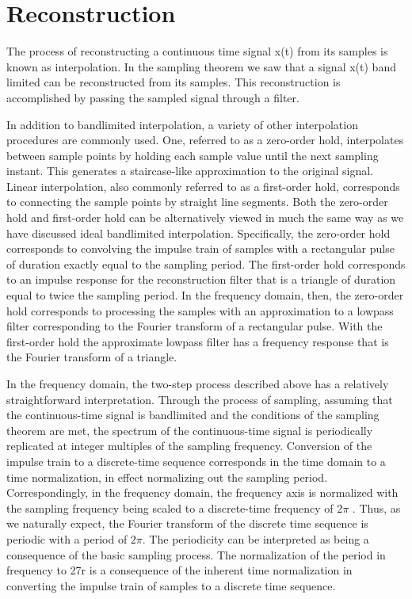 \documentclass{article}
\begin{document}
\section{Reconstruction}

The process of reconstructing a continuous time signal x(t) from its samples is known as interpolation. In the sampling theorem we saw that a signal x(t) band limited can be reconstructed from its samples. This reconstruction is accomplished by passing the sampled signal through a filter.  

In addition to bandlimited interpolation, a variety of other interpolation procedures are commonly used. One, referred to as a zero-order hold, interpolates between sample points by holding each sample value until the next sampling instant. This generates a staircase-like approximation to the original signal. Linear interpolation, also commonly referred to as a first-order hold, corresponds to connecting the sample points by straight line segments. Both the zero-order hold and first-order hold can be alternatively viewed in much the same way as we have discussed ideal bandlimited interpolation. Specifically, the zero-order hold corresponds to convolving the impulse train of samples with a rectangular pulse of duration exactly equal to the sampling period. The first-order hold corresponds to an impulse response for the reconstruction filter that is a triangle of duration equal to twice the sampling period. In the frequency domain, then, the zero-order hold corresponds to processing the samples with an approximation to a lowpass filter corresponding to the Fourier transform of a rectangular pulse. With the first-order hold the approximate lowpass filter has a frequency response that is the Fourier transform of a triangle.

In the frequency domain, the two-step process described above has a relatively straightforward interpretation. Through the process of sampling, assuming that the continuous-time signal is bandlimited and the conditions of the sampling theorem are met, the spectrum of the continuous-time signal is periodically replicated at integer multiples of the sampling frequency. Conversion of the impulse train to a discrete-time sequence corresponds in the time domain to a time normalization, in effect normalizing out the sampling period. Correspondingly, in the frequency domain, the frequency axis is normalized with the sampling frequency being scaled to a discrete-time frequency of $2 \pi $ . Thus, as we naturally expect, the Fourier transform of the discrete time sequence is periodic with a period of $2 \pi $. The periodicity can be interpreted as being a consequence of the basic sampling process. The normalization of the period in frequency to 27r is a consequence of the inherent time normalization in converting the impulse train of samples to a discrete time sequence.
\end{document}
